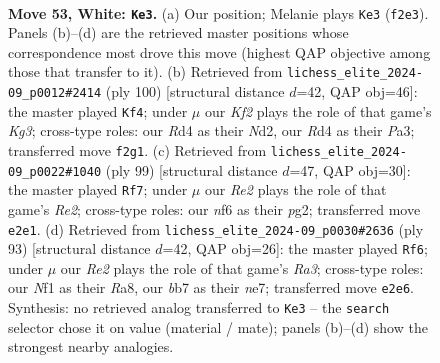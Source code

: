 \documentclass[11pt]{article}
\begin{document}
\clearpage

\begin{figure}[p]\centering
\begin{subfigure}{0.46\textwidth}\centering
\resizebox{\linewidth}{!}{%
\newchessgame
\chessboard[
  setfen={8/qb3pk1/5np1/8/3R3P/8/4RK1P/5N2 w - - 13 53},
  showmover=false,
  pgfstyle=straightmove, color=movearrow, markmove={f2-e3}
]}
\caption{}
\end{subfigure}\hfill
\begin{subfigure}{0.46\textwidth}\centering
\resizebox{\linewidth}{!}{%
\newchessgame
\chessboard[
  setfen={6k1/6p1/1p6/8/4P3/P2p2KP/1q1N2R1/8 w - - 0 51},
  showmover=false,
  pgfstyle=straightmove, color=movearrow, markmove={g3-f4}
]}
\caption{}
\end{subfigure}
\\[4pt]
\begin{subfigure}{0.46\textwidth}\centering
\resizebox{\linewidth}{!}{%
\newchessgame
\chessboard[
  setfen={8/4r1k1/5r1p/8/3Q4/7P/6PK/8 b - - 12 50},
  showmover=false,
  pgfstyle=straightmove, color=movearrow, markmove={e7-f7}
]}
\caption{}
\end{subfigure}\hfill
\begin{subfigure}{0.46\textwidth}\centering
\resizebox{\linewidth}{!}{%
\newchessgame
\chessboard[
  setfen={r7/4NQpk/r6p/8/8/6PK/7P/8 b - - 13 47},
  showmover=false,
  pgfstyle=straightmove, color=movearrow, markmove={a6-f6}
]}
\caption{}
\end{subfigure}
\caption{\textbf{Move 53, White: \texttt{Ke3}.} (a) Our position; Melanie plays \texttt{Ke3} (\texttt{f2e3}). Panels (b)--(d) are the retrieved master positions whose correspondence most drove this move (highest QAP objective among those that transfer to it). (b) Retrieved from \texttt{lichess\_elite\_2024-09\_p0012\#2414} (ply 100) [structural distance $d$=42, QAP obj=46]: the master played \texttt{Kf4}; under $\mu$ our \emph{Kf2} plays the role of that game's \emph{Kg3}; cross-type roles: our \emph{R}d4 as their \emph{N}d2, our \emph{R}d4 as their \emph{P}a3; transferred move \texttt{f2g1}. (c) Retrieved from \texttt{lichess\_elite\_2024-09\_p0022\#1040} (ply 99) [structural distance $d$=47, QAP obj=30]: the master played \texttt{Rf7}; under $\mu$ our \emph{Re2} plays the role of that game's \emph{Re2}; cross-type roles: our \emph{n}f6 as their \emph{p}g2; transferred move \texttt{e2e1}. (d) Retrieved from \texttt{lichess\_elite\_2024-09\_p0030\#2636} (ply 93) [structural distance $d$=42, QAP obj=26]: the master played \texttt{Rf6}; under $\mu$ our \emph{Re2} plays the role of that game's \emph{Ra3}; cross-type roles: our \emph{N}f1 as their \emph{R}a8, our \emph{b}b7 as their \emph{n}e7; transferred move \texttt{e2e6}. Synthesis: no retrieved analog transferred to \texttt{Ke3} -- the \texttt{search} selector chose it on value (material / mate); panels (b)--(d) show the strongest nearby analogies.}
\label{fig:thought-m104}
\end{figure}
\end{document}
